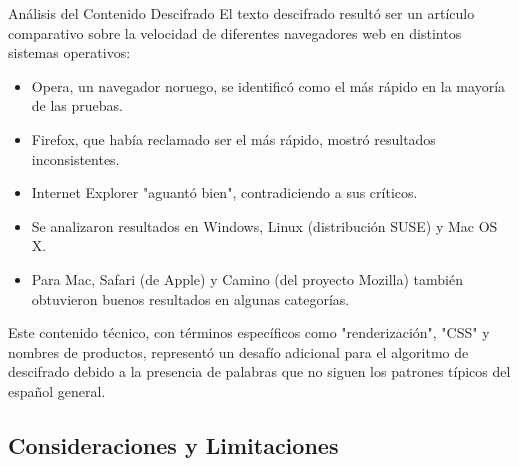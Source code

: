 \begin{cryptoanalysis}{Análisis del Contenido Descifrado}
El texto descifrado resultó ser un artículo comparativo sobre la velocidad de diferentes navegadores web en distintos sistemas operativos:

\begin{itemize}
    \item Opera, un navegador noruego, se identificó como el más rápido en la mayoría de las pruebas.
    \item Firefox, que había reclamado ser el más rápido, mostró resultados inconsistentes.
    \item Internet Explorer "aguantó bien", contradiciendo a sus críticos.
    \item Se analizaron resultados en Windows, Linux (distribución SUSE) y Mac OS X.
    \item Para Mac, Safari (de Apple) y Camino (del proyecto Mozilla) también obtuvieron buenos resultados en algunas categorías.
\end{itemize}

Este contenido técnico, con términos específicos como "renderización", "CSS" y nombres de productos, representó un desafío adicional para el algoritmo de descifrado debido a la presencia de palabras que no siguen los patrones típicos del español general.
\end{cryptoanalysis}

\subsection{Consideraciones y Limitaciones}

